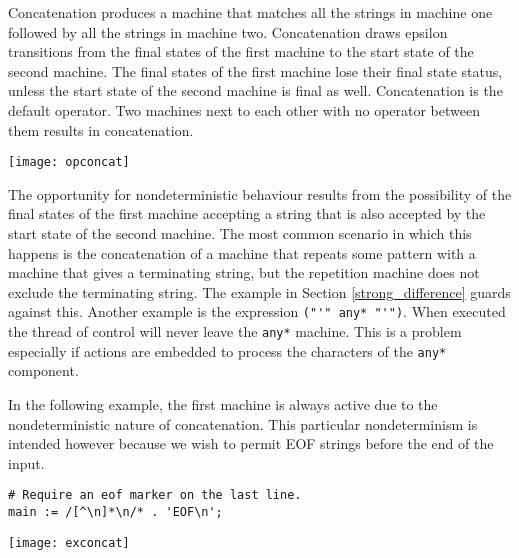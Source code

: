 \documentclass[letterpaper,11pt,oneside]{book}
\newcommand{\graphspace}{\vspace{10pt}}
\newenvironment{inline_code}{\def\baselinestretch{1}\vspace{12pt}\small}{}
\begin{document}
Concatenation produces a machine that matches all the strings in machine one followed by all
the strings in machine two.  Concatenation draws epsilon transitions from the
final states of the first machine to the start state of the second machine. The
final states of the first machine lose their final state status, unless the
start state of the second machine is final as well. 
Concatenation is the default operator. Two machines next to each other with no
operator between them results in concatenation.

\graphspace
\begin{center}
\texttt{[image: opconcat]}
\end{center}
\graphspace

The opportunity for nondeterministic behaviour results from the possibility of
the final states of the first machine accepting a string that is also accepted
by the start state of the second machine.
The most common scenario in which this happens is the
concatenation of a machine that repeats some pattern with a machine that gives
a terminating string, but the repetition machine does not exclude the
terminating string. The example in Section \ref{strong_difference}
guards against this. Another example is the expression \verb|("'" any* "'")|.
When executed the thread of control will
never leave the \verb|any*| machine.  This is a problem especially if actions
are embedded to process the characters of the \verb|any*| component.

In the following example, the first machine is always active due to the
nondeterministic nature of concatenation. This particular nondeterminism is intended
however because we wish to permit EOF strings before the end of the input.

\begin{inline_code}
\begin{verbatim}
# Require an eof marker on the last line.
main := /[^\n]*\n/* . 'EOF\n';
\end{verbatim}
\end{inline_code}

\graphspace
\begin{center}
\texttt{[image: exconcat]}
\end{center}
\graphspace
\end{document}
